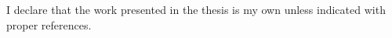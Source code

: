 
\begin{originality}
I declare that the work presented in the thesis is my own unless indicated with proper references.
\end{originality}
